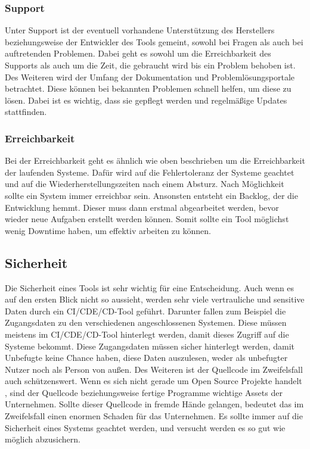 \subsubsection{Support}
Unter Support ist der eventuell vorhandene Unterstützung des Herstellers beziehungsweise der Entwickler des Tools gemeint, sowohl bei Fragen als auch bei auftretenden Problemen. Dabei geht es sowohl um die Erreichbarkeit des Supports als auch um die Zeit, die gebraucht wird bis ein Problem behoben ist. Des Weiteren wird der Umfang der Dokumentation und Problemlösungsportale betrachtet. Diese können bei bekannten Problemen schnell helfen, um diese zu lösen. Dabei ist es wichtig, dass sie gepflegt werden und regelmäßige Updates stattfinden.
\subsubsection{Erreichbarkeit}
Bei der Erreichbarkeit geht es ähnlich wie oben beschrieben um die Erreichbarkeit der laufenden Systeme. Dafür wird auf die Fehlertoleranz der Systeme geachtet und auf die Wiederherstellungszeiten nach einem Absturz. Nach Möglichkeit sollte ein System immer erreichbar sein. Ansonsten entsteht ein Backlog, der die Entwicklung hemmt. Dieser muss dann erstmal abgearbeitet werden, bevor wieder neue Aufgaben erstellt werden können. Somit sollte ein Tool möglichst wenig Downtime haben, um effektiv arbeiten zu können.
\subsection{Sicherheit}
Die Sicherheit eines Tools ist sehr wichtig für eine Entscheidung. Auch wenn es auf den ersten Blick nicht so aussieht, werden sehr viele vertrauliche und sensitive Daten durch ein \ac{CI}/\ac{CDE}/\ac{CD}-Tool geführt. Darunter fallen zum Beispiel die Zugangsdaten zu den verschiedenen angeschlossenen Systemen. Diese müssen meistens im \ac{CI}/\ac{CDE}/\ac{CD}-Tool hinterlegt werden, damit dieses Zugriff auf die Systeme bekommt. Diese Zugangsdaten müssen sicher hinterlegt werden, damit Unbefugte keine Chance haben, diese Daten auszulesen, weder als unbefugter Nutzer noch als Person von außen. Des Weiteren ist der Quellcode im Zweifelsfall auch schützenswert. Wenn es sich nicht gerade um Open Source Projekte handelt , sind der Quellcode beziehungsweise fertige Programme wichtige Assets der Unternehmen. Sollte dieser Quellcode in fremde Hände gelangen, bedeutet das im Zweifelsfall einen enormen Schaden für das Unternehmen. Es sollte immer auf die Sicherheit eines Systems geachtet werden, und versucht werden es so gut wie möglich abzusichern.
